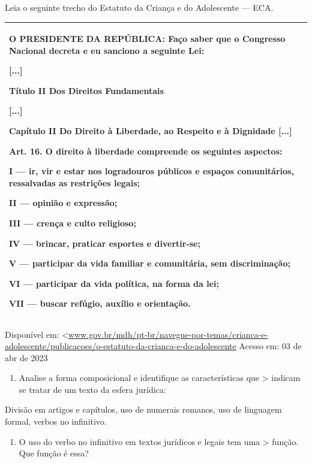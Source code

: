 {Leia o seguinte trecho do Estatuto da Criança e do Adolescente --- ECA.

\begin{longtable}[]{@{}
  >{\raggedright\arraybackslash}p{}@{}}
\toprule
\endhead
O PRESIDENTE DA REPÚBLICA: Faço saber que o Congresso Nacional decreta e
eu sanciono a seguinte Lei:

{[}...{]}

Título II Dos Direitos Fundamentais

{[}...{]}

Capítulo II Do Direito à Liberdade, ao Respeito e à Dignidade {[}...{]}

Art. 16. O direito à liberdade compreende os seguintes aspectos:

I --- ir, vir e estar nos logradouros públicos e espaços comunitários,
ressalvadas as restrições legais;

II --- opinião e expressão;

III --- crença e culto religioso;

IV --- brincar, praticar esportes e divertir-se;

V --- participar da vida familiar e comunitária, sem discriminação;

VI --- participar da vida política, na forma da lei;

VII --- buscar refúgio, auxílio e orientação. \\
\bottomrule
\end{longtable}

Disponível em:
\textless{}\href{http://www.gov.br/mdh/pt-br/navegue-por-temas/crianca-e-adolescente/publicacoes/o-estatuto-da-crianca-e-do-adolescente}{\uline{www.gov.br/mdh/pt-br/navegue-por-temas/crianca-e-adolescente/publicacoes/o-estatuto-da-crianca-e-do-adolescente}}
Acesso em: 03 de abr de 2023

\begin{enumerate}
\def\labelenumi{\arabic{enumi})}
\setcounter{enumi}{3}
\tightlist
\item
  Analise a forma composicional e identifique as características que
  \textgreater{} indicam se tratar de um texto da esfera jurídica:
\end{enumerate}

Divisão em artigos e capítulos, uso de numerais romanos, uso de
linguagem formal, verbos no infinitivo.

\begin{enumerate}
\def\labelenumi{\arabic{enumi})}
\setcounter{enumi}{4}
\tightlist
\item
  O uso do verbo no infinitivo em textos jurídicos e legais tem uma
  \textgreater{} função. Que função é essa?
\end{enumerate}

}
